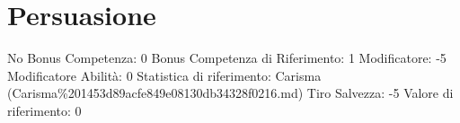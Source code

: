 \section{Persuasione}\label{persuasione}

\begin{description}
\tightlist
\item[Tags: ABI]
No Bonus Competenza: 0 Bonus Competenza di Riferimento: 1 Modificatore:
-5 Modificatore Abilità: 0 Statistica di riferimento: Carisma
(Carisma\%201453d89acfe849e08130db34328f0216.md) Tiro Salvezza: -5
Valore di riferimento: 0
\end{description}
